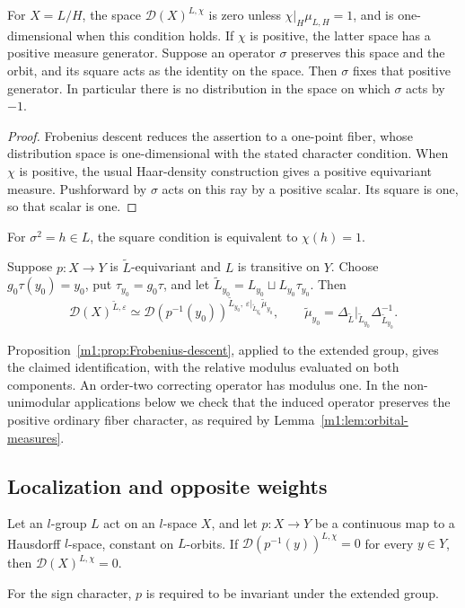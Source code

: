 \begin{lemma}
\label{m1:lem:orbital-measures}\label{m2:tools:orbit}\label{m1:cor:homogeneous-transpose}
For $X=L/H$, the space $\mathcal D(X)^{L,\chi}$ is zero unless
$\chi|_H\mu_{L,H}=1$, and is one-dimensional when this condition holds.
If $\chi$ is positive, the latter space has a positive measure generator.
Suppose an operator $\sigma$ preserves this space and the orbit, and its
square acts as the identity on the space. Then $\sigma$ fixes that
positive generator. In particular there is no distribution in the space
on which $\sigma$ acts by $-1$.
\end{lemma}
\begin{proof}
Frobenius descent reduces the assertion to a one-point fiber, whose
distribution space is one-dimensional with the stated character condition. When $\chi$ is positive, the
usual Haar-density construction gives a positive equivariant measure.
Pushforward by $\sigma$ acts on this ray by a positive scalar. Its square
is one, so that scalar is one.
\end{proof}
For $\sigma^2=h\in L$, the square condition is equivalent to $\chi(h)=1$.

\begin{proposition}\label{m1:prop:odd-Frobenius}
Suppose $p:X\to Y$ is $\widetilde L$-equivariant and $L$ is transitive on
$Y$. Choose $g_0\tau(y_0)=y_0$, put $\tau_{y_0}=g_0\tau$, and let
$\widetilde L_{y_0}=L_{y_0}\sqcup L_{y_0}\tau_{y_0}$. Then
\begin{equation}\label{m1:eq:odd-Frobenius}
 \mathcal D(X)^{\widetilde L,\varepsilon}
 \simeq\mathcal D(p^{-1}(y_0))^{\widetilde L_{y_0},\,
 \varepsilon|_{\widetilde L_{y_0}}\widetilde\mu_{y_0}},\qquad
 \widetilde\mu_{y_0}=
 \Delta_{\widetilde L}|_{\widetilde L_{y_0}}
 \Delta_{\widetilde L_{y_0}}^{-1}.
\end{equation}
\end{proposition}
Proposition~\ref{m1:prop:Frobenius-descent}, applied to the extended
group, gives the claimed identification, with the relative modulus
evaluated on both components. An order-two
correcting operator has modulus one. In the non-unimodular applications below we check that the induced operator
preserves the positive ordinary fiber character, as required by
Lemma~\ref{m1:lem:orbital-measures}.

\subsection{Localization and opposite weights}\label{m1:subsec:localization}
\begin{proposition}
\label{m1:prp:localization}\label{m2:tools:localization}
Let an $l$-group $L$ act on an $l$-space $X$, and let $p:X\to Y$ be a
continuous map to a Hausdorff $l$-space, constant on $L$-orbits. If
$\mathcal D(p^{-1}(y))^{L,\chi}=0$ for every $y\in Y$, then
$\mathcal D(X)^{L,\chi}=0$.
\end{proposition}
For the sign character, $p$ is required to be invariant under the extended group.

